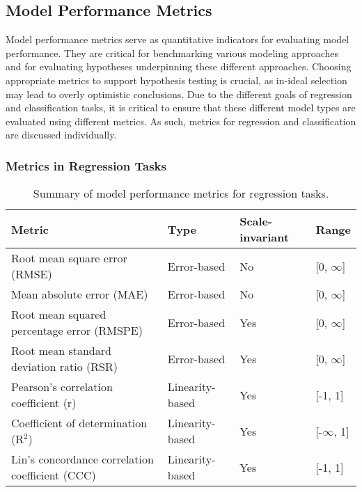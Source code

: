 \subsection{Model Performance Metrics}

Model performance metrics serve as quantitative indicators for evaluating model performance. They are critical for benchmarking various modeling approaches and for evaluating hypotheses underpinning these different approaches. Choosing appropriate metrics to support hypothesis testing is crucial, as in-ideal selection may lead to overly optimistic conclusions. Due to the different goals of regression and classification tasks, it is critical to ensure that these different model types are evaluated using different metrics. As such, metrics for regression and classification are discussed individually.

\subsubsection{Metrics in Regression Tasks}

\begin{table}[H]
    \caption{Summary of model performance metrics for regression tasks.}
    \centering
    \begin{tabular}{llll}
        \toprule
        Metric & Type & Scale-invariant & Range \\
        \midrule
        Root mean square error (RMSE) & Error-based & No & [0, $\infty$] \\
        Mean absolute error (MAE) & Error-based & No & [0, $\infty$] \\
        Root mean squared percentage error (RMSPE) & Error-based & Yes & [0, $\infty$] \\
        Root mean standard deviation ratio (RSR) & Error-based & Yes & [0, $\infty$] \\
        Pearson's correlation coefficient (r) & Linearity-based  & Yes & [-1, 1] \\
        Coefficient of determination (R$^2$) & Linearity-based & Yes & [-$\infty$, 1] \\
        Lin's concordance correlation coefficient (CCC) & Linearity-based & Yes & [-1, 1] \\
        \bottomrule
    \end{tabular}
    \label{tab:metrics-reg}
\end{table}

